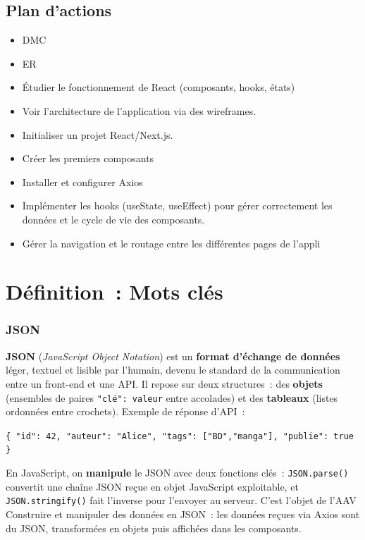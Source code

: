 \subsection*{Plan d'actions}
{}
\begin{itemize}
	\item DMC
	\item ER
	\item Étudier le fonctionnement de React (composants, hooks, états)
	\item Voir l'architecture de l'application via des wireframes.
	\item Initialiser un projet React/Next.js.
	\item Créer les premiers composants
	\item Installer et configurer Axios 
	\item Implémenter les hooks (useState, useEffect) pour gérer correctement les données et le cycle de vie des composants.
	\item Gérer la navigation et le routage entre les différentes pages de l'appli
\end{itemize}

\newpage

\section*{Définition~: Mots clés}
{}

\subsubsection*{JSON}
{}

\noindent \textbf{JSON} (\textit{JavaScript Object Notation}) est un \textbf{format d'échange de données} léger, textuel et lisible par l'humain, devenu le standard de la communication entre un front-end et une API. Il repose sur deux structures~: des \textbf{objets} (ensembles de paires \texttt{"clé": valeur} entre accolades) et des \textbf{tableaux} (listes ordonnées entre crochets). Exemple de réponse d'API~:
\begin{center}
\texttt{\{ "id": 42, "auteur": "Alice", "tags": ["BD","manga"], "publie": true \}}
\end{center}
\noindent En JavaScript, on \textbf{manipule} le JSON avec deux fonctions clés~: \texttt{JSON.parse()} convertit une chaîne JSON reçue en objet JavaScript exploitable, et \texttt{JSON.stringify()} fait l'inverse pour l'envoyer au serveur. C'est l'objet de l'AAV \og{}Construire et manipuler des données en JSON\fg{}~: les données reçues via Axios sont du JSON, transformées en objets puis affichées dans les composants.

